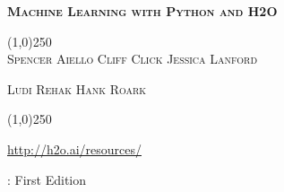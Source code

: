 


\newcommand{\waterVersion}{3.2.0.8}






\thispagestyle{empty} %


\begin{center}
\textsc{\Large\bf{Machine Learning with Python and H2O}}

\bigskip
\line(1,0){250}  %
\\
\bigskip
\small
\textsc{Spencer Aiello \hspace{10pt} Cliff Click \hspace{10pt} Jessica Lanford \hspace{10pt} }

\textsc{Ludi Rehak \hspace{10pt} Hank Roark}

\normalsize

\line(1,0){250}  %

{\url{http://h2o.ai/resources/}}

\bigskip

\monthname \hspace{1pt}  \the\year: First Edition 

\bigskip
\end{center}


\newpage
\restoregeometry

\null\vfill %

\thispagestyle{empty}%

